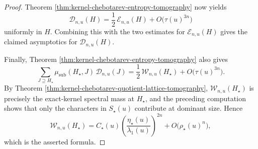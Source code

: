 \begin{proof}
Theorem \ref{thm:kernel-chebotarev-entropy-tomography} now yields
\[
\mathcal D_{n,u}(H)=\frac12\,\mathcal E_{n,u}(H)+O\!\bigl(\tau(u)^{3n}\bigr)
\]
uniformly in \(H\). Combining this with the two estimates for \(\mathcal E_{n,u}(H)\) gives the claimed asymptotics for \(\mathcal D_{n,u}(H)\).

Finally, Theorem \ref{thm:kernel-chebotarev-entropy-tomography} also gives
\[
\sum_{J\supseteq H_\star}\mu_{\mathrm{sub}}(H_\star,J)\,\mathcal D_{n,u}(J)
=
\frac12\,\mathcal W_{n,u}(H_\star)+O\!\bigl(\tau(u)^{3n}\bigr).
\]
By Theorem \ref{thm:kernel-chebotarev-quotient-lattice-tomography}, \(\mathcal W_{n,u}(H_\star)\) is precisely the exact-kernel spectral mass at \(H_\star\), and the preceding computation shows that only the characters in \(S_\star(u)\) contribute at dominant size. Hence
\[
\mathcal W_{n,u}(H_\star)
=
C_\star(u)\left(\frac{\eta_\star(u)}{\lambda_1(u)}\right)^{2n}
+
O\!\bigl(\rho_\star(u)^n\bigr),
\]
which is the asserted formula.
\end{proof}
\endinput
